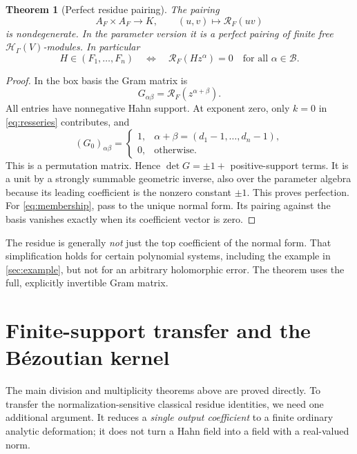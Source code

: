 \documentclass[11pt,letterpaper]{article}
\newtheorem{theorem}{Theorem}[section]
\theoremstyle{definition}
\theoremstyle{remark}
\newcommand{\HH}{\mathcal H}
\newcommand{\BB}{\mathcal B}
\newcommand{\RR}{\mathscr R}
\numberwithin{equation}{section}
\begin{document}
\begin{theorem}[Perfect residue pairing]\label{thm:duality}
The pairing
\begin{equation}\label{eq:pairing}
 A_F\times A_F\longrightarrow K,\qquad
 (u,v)\longmapsto\RR_F(uv)
\end{equation}
is nondegenerate. In the parameter version it is a perfect pairing of finite free $\HH_\Gamma(V)$-modules. In particular
\begin{equation}\label{eq:membership}
 H\in(F_1,\ldots,F_n)
 \quad\Longleftrightarrow\quad
 \RR_F(Hz^\alpha)=0\quad\text{for all }\alpha\in\BB.
\end{equation}
\end{theorem}
\begin{proof}
In the box basis the Gram matrix is
\[
 G_{\alpha\beta}=\RR_F(z^{\alpha+\beta}).
\]
All entries have nonnegative Hahn support. At exponent zero, only $k=0$ in \eqref{eq:resseries} contributes, and
\[
 (G_0)_{\alpha\beta}=
 \begin{cases}1,&\alpha+\beta=(d_1-1,\ldots,d_n-1),\\0,&\text{otherwise}.
 \end{cases}
\]
This is a permutation matrix. Hence $\det G=\pm1+$ positive-support terms. It is a unit by a strongly summable geometric inverse, also over the parameter algebra because its leading coefficient is the nonzero constant $\pm1$. This proves perfection. For \eqref{eq:membership}, pass to the unique normal form. Its pairing against the basis vanishes exactly when its coefficient vector is zero.
\end{proof}

The residue is generally \emph{not} just the top coefficient of the normal form. That simplification holds for certain polynomial systems, including the example in \cref{sec:example}, but not for an arbitrary holomorphic error. The theorem uses the full, explicitly invertible Gram matrix.

\section{Finite-support transfer and the B\'ezoutian kernel}\label{sec:transfer}
The main division and multiplicity theorems above are proved directly. To transfer the normalization-sensitive classical residue identities, we need one additional argument. It reduces a \emph{single output coefficient} to a finite ordinary analytic deformation; it does not turn a Hahn field into a field with a real-valued norm.
\end{document}
